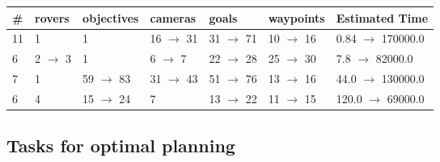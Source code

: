 \documentclass{article}
\begin{document}
                        \begin{center}
                        \begin{tabular}{@{}l|l|l|l|l|l|l@{}}
                        \# & rovers & objectives & cameras & goals & waypoints & Estimated Time\\\midrule
                        11&1&1&16 $\rightarrow$ 31&31 $\rightarrow$ 71&10 $\rightarrow$ 16&0.84 $\rightarrow$ 170000.0\\
6&2 $\rightarrow$ 3&1&6 $\rightarrow$ 7&22 $\rightarrow$ 28&25 $\rightarrow$ 30&7.8 $\rightarrow$ 82000.0\\
7&1&59 $\rightarrow$ 83&31 $\rightarrow$ 43&51 $\rightarrow$ 76&13 $\rightarrow$ 16&44.0 $\rightarrow$ 130000.0\\
6&4&15 $\rightarrow$ 24&7&13 $\rightarrow$ 22&11 $\rightarrow$ 15&120.0 $\rightarrow$ 69000.0
                        \end{tabular}
                        \end{center}
                    
                                \subsection*{Tasks for optimal planning}
                                
\end{document}
